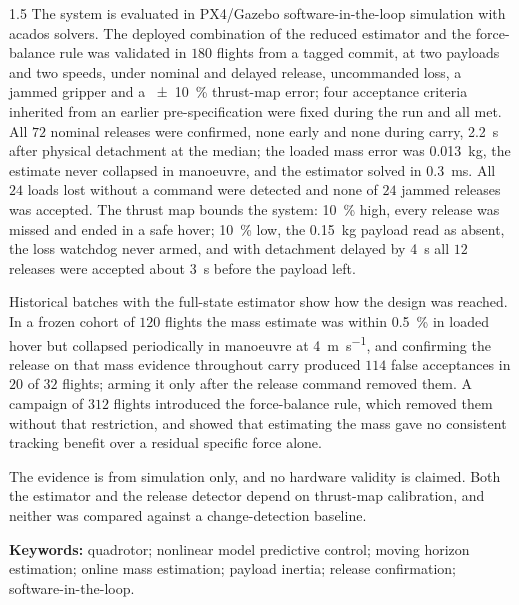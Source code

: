 \begin{spacing}{1.5}
The system is evaluated in PX4/Gazebo software-in-the-loop simulation with
acados solvers. The deployed combination of the reduced estimator and the
force-balance rule was validated in $180$ flights from a tagged commit, at two
payloads and two speeds, under nominal and delayed release, uncommanded loss, a
jammed gripper and a \SI{\pm10}{\percent} thrust-map error; four acceptance
criteria inherited from an earlier pre-specification were fixed during the run
and all met. All $72$ nominal releases were confirmed, none early and none during
carry, \SI{2.2}{\second} after physical detachment at the median; the loaded mass
error was \SI{0.013}{\kg}, the estimate never collapsed in manoeuvre, and the
estimator solved in \SI{0.3}{\milli\second}. All $24$ loads lost without a
command were detected and none of $24$ jammed releases was accepted. The thrust
map bounds the system: \SI{10}{\percent} high, every release was missed and
ended in a safe hover; \SI{10}{\percent} low, the \SI{0.15}{\kg} payload read as
absent, the loss watchdog never armed, and with detachment delayed by
\SI{4}{\second} all $12$ releases were accepted about \SI{3}{\second} before the
payload left.

Historical batches with the full-state estimator show how the design was
reached. In a frozen cohort of $120$ flights the mass estimate was within
\SI{0.5}{\percent} in loaded hover but collapsed periodically in manoeuvre at
\SI{4}{\meter\per\second}, and confirming the release on that mass evidence
throughout carry produced $114$ false acceptances in $20$ of $32$ flights;
arming it only after the release command removed them. A campaign of $312$
flights introduced the force-balance rule, which removed them without that
restriction, and showed that estimating the mass gave no consistent tracking
benefit over a residual specific force alone.

The evidence is from simulation only, and no hardware validity is claimed. Both
the estimator and the release detector depend on thrust-map calibration, and
neither was compared against a change-detection baseline.

\textbf{Keywords:} quadrotor; nonlinear model predictive control; moving horizon
estimation; online mass estimation; payload inertia; release confirmation;
software-in-the-loop.
\end{spacing}
\newpage
